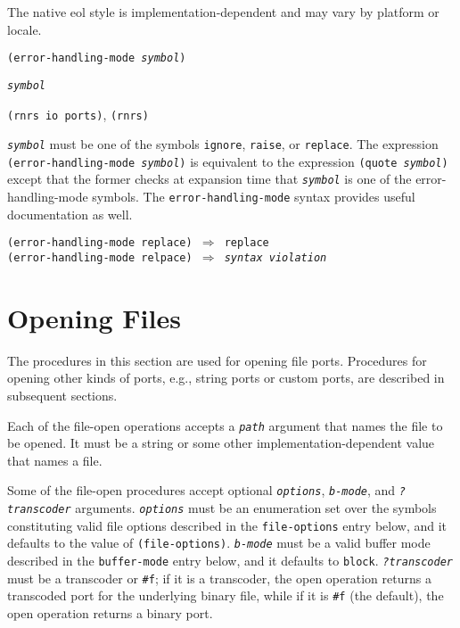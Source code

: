 The native eol style is implementation-dependent and may vary
by platform or locale.


\begin{description}

\label{io_s25}\item[syntax] \texttt{(error-handling-mode \textit{symbol})}



\item[returns] \texttt{\textit{symbol}}


\item[libraries] \texttt{(rnrs io ports)}, \texttt{(rnrs)}
\end{description}

\texttt{\textit{symbol}} must be one of the symbols \texttt{ignore}, \texttt{raise},
or \texttt{replace}.
The expression \texttt{(error-handling-mode \textit{symbol})} is equivalent to the
expression \texttt{(quote \textit{symbol})} except that the former checks at
expansion time that \texttt{\textit{symbol}} is one of the error-handling-mode symbols.
The \texttt{error-handling-mode} syntax provides useful documentation as well.

\begin{alltt}
(error-handling-mode replace) \(\Rightarrow\) replace
(error-handling-mode relpace) \(\Rightarrow\) \textit{syntax violation}
\end{alltt}

\section{\label{io_g123}\label{io_h2}Opening Files\label{io_SECTOPENINGFILES}}



The procedures in this section are used for opening file ports.
Procedures for opening other kinds of ports, e.g., string
ports or custom ports, are described in subsequent sections.


Each of the file-open operations accepts a \texttt{\textit{path}} argument
that names the file to be opened.
It must be a string or some other implementation-dependent value that
names a file.


Some of the file-open procedures accept optional \texttt{\textit{options}},
\texttt{\textit{b-mode}}, and \texttt{\textit{?transcoder}} arguments.
\texttt{\textit{options}} must be an enumeration set over the symbols constituting
valid file options described in the \texttt{file-options} entry below,
and it defaults to the value of \texttt{(file-options)}.
\texttt{\textit{b-mode}} must be a valid buffer mode described in the \texttt{buffer-mode}
entry below, and it defaults to \texttt{block}.
\texttt{\textit{?transcoder}} must be a transcoder or \texttt{\#{}f}; if it
is a transcoder, the open operation returns a transcoded port for
the underlying binary file, while if it is \texttt{\#{}f} (the
default), the open operation returns a binary port.


